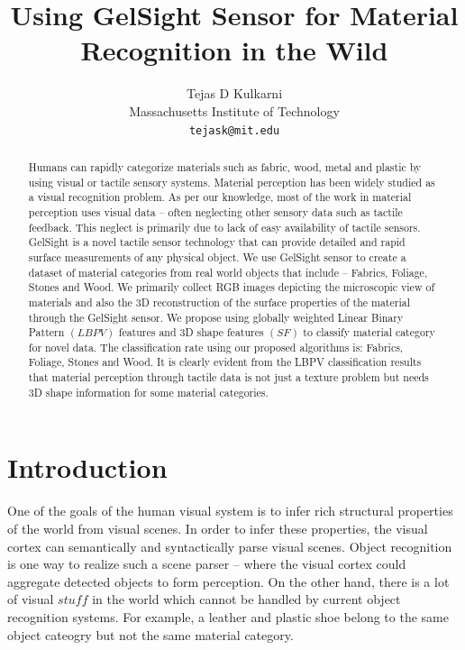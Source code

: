 \documentclass[10pt,twocolumn,letterpaper]{article}
\begin{document}
\title{Using GelSight Sensor for Material Recognition in the Wild}

\author{Tejas D Kulkarni\\
Massachusetts Institute of Technology\\
{\tt\small tejask@mit.edu}
}

\maketitle

\begin{abstract}
Humans can rapidly categorize materials such as fabric, wood, metal and plastic by using visual or tactile sensory systems. Material perception
has been widely studied as a visual recognition problem. As per our knowledge, most of the work in material 
perception uses visual data -- often neglecting other sensory data such as tactile feedback. This neglect is 
primarily due to lack of easy availability of tactile sensors. GelSight is a novel tactile sensor technology that can
provide detailed and rapid surface measurements of any physical object. We use GelSight sensor to create a dataset of
material categories from real world objects that include -- Fabrics, Foliage, Stones and Wood. We primarily collect RGB
images depicting the microscopic view of materials and also the 3D reconstruction of the surface properties of the material
through the GelSight sensor. We propose using globally weighted Linear Binary Pattern $(LBPV)$ features and 3D shape features $(SF)$ to classify
material category for novel data. The classification rate using our proposed algorithms is: Fabrics, Foliage, Stones and Wood. 
It is clearly evident from the LBPV classification results that material perception through tactile data
is not just a texture problem but needs 3D shape information for some material categories. 
\end{abstract}


\section{Introduction}
One of the goals of the human visual system is to infer rich structural properties of the world from visual scenes. In order to infer these properties, 
the visual cortex can semantically and syntactically parse visual scenes. Object recognition is one way to realize such a scene parser -- where the visual cortex
could aggregate detected objects to form perception. On the other hand, there is a lot of visual $stuff$ in the world which cannot be handled by current object 
recognition systems. For example, a leather and plastic shoe belong to the same object cateogry but not the same material category. 
\end{document}
